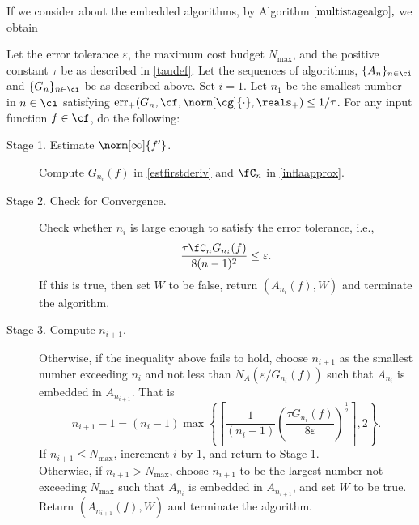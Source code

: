 If we consider about the embedded algorithms, by Algorithm $\ref{multistagealgo},$ we obtain
\begin{algo} \label{multistageapproalgo}
Let the error tolerance $\varepsilon$, the maximum cost budget $N_{\max}$, and the positive constant $\tau$ be as described in  \eqref{taudef}. Let the sequences of algorithms, $\{A_n\}_{n \in \ci}$ and  $\{G_n\}_{n \in \ci}$ be as described above.  Set $i=1$.  Let $n_1$ be the smallest number in $n \in \ci$ satisfying $\err_+(G_n,\cf,\norm[\cg]{\cdot},\reals_+) \le 1/\tau$. For any input function $f \in \cf$, do the following:
\begin{description}

\item [Stage 1. Estimate {$\norm[\infty]{f'} $}.]
Compute $G_{n_i}(f)$ in \eqref{estfirstderiv} and $\fC_n$ in \eqref{inflaapprox}.
\item [Stage 2. Check for Convergence.]
 Check whether $n_i$ is large enough to satisfy the error tolerance, i.e.,
$$
\frac{\tau \fC_n G_{n_i}(f)}{8(n-1)^2} \le \varepsilon.
$$
If this is true, then set $W$ to be false, return $(A_{n_i}(f),W)$ and terminate the algorithm.


\item[Stage 3. Compute $n_{i+1}$.]  Otherwise, if the inequality above fails to hold,
choose $n_{i+1}$ as the smallest number exceeding $n_i$ and not less than $N_{A}(\varepsilon /G_{n_i}(f))$ such that $A_{n_{i}}$ is embedded in $A_{n_{i+1}}$. That is
$$n_{i+1}-1=(n_i-1)\max\left\{\left\lceil\frac{1}{(n_i-1)}\left(\frac{\tau G_{n_i}(f)}{8\varepsilon}\right)^{\frac{1}{2}}\right\rceil,2\right\}.$$
 If $n_{i+1} \le N_{\max}$, increment $i$ by $1$, and return to Stage 1.\\
Otherwise, if $n_{i+1} > N_{\max}$, choose $n_{i+1}$ to be the largest number not exceeding $N_{\max}$ such that $A_{n_{i}}$ is embedded in $A_{n_{i+1}}$, and set $W$ to be true. Return $(A_{n_{i+1}}(f),W)$ and terminate the algorithm.
\end{description}
\end{algo}


